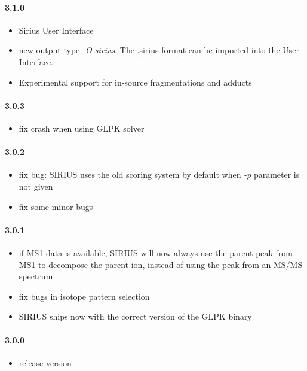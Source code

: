 \paragraph{3.1.0}

\begin{itemize}

\item
  Sirius User Interface
\item
  new output type \emph{-O sirius}. The .sirius format can be imported
  into the User Interface.
\item
  Experimental support for in-source fragmentations and adducts
\end{itemize}

\paragraph{3.0.3}

\begin{itemize}

\item
  fix crash when using GLPK solver
\end{itemize}

\paragraph{3.0.2}

\begin{itemize}

\item
  fix bug: SIRIUS uses the old scoring system by default when \emph{-p}
  parameter is not given
\item
  fix some minor bugs
\end{itemize}

\paragraph{3.0.1}

\begin{itemize}

\item
  if MS1 data is available, SIRIUS will now always use the parent peak
  from MS1 to decompose the parent ion, instead of using the peak from
  an MS/MS spectrum
\item
  fix bugs in isotope pattern selection
\item
  SIRIUS ships now with the correct version of the GLPK binary
\end{itemize}

\paragraph{3.0.0}

\begin{itemize}
\item
  release version
\end{itemize}
